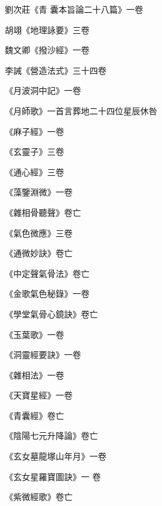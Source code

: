 \begin{pinyinscope}
 劉次莊《青
 囊本旨論二十八篇》一卷



 胡翊《地理詠要》三卷



 魏文卿《撥沙經》一卷



 李誡《營造法式》三十四卷



 《月波洞中記》一卷



 《月師歌》一首言葬地二十四位星辰休咎



 《麻子經》一卷



 《玄靈子》三卷



 《通心經》三卷



 《藻鑒淵微》一卷



 《雜相骨聽聲》卷亡



 《氣色微應》三卷



 《通微妙訣》卷亡



 《中定聲氣骨法》卷亡



 《金歌氣色秘錄》一卷



 《學堂氣骨心鏡訣》卷亡



 《玉葉歌》一卷



 《洞靈經要訣》一卷



 《雜相法》一卷



 《天寶星經》一卷



 《青囊經》卷亡



 《陰陽七元升降論》卷亡



 《玄女墓龍塚山年月》一卷



 《玄女星羅寶圖訣》一
 卷



 《紫微經歌》卷亡




\end{pinyinscope}
